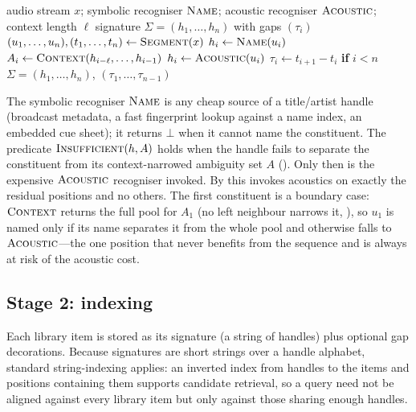 \documentclass[11pt,twocolumn,a4paper]{article}
\theoremstyle{thmstyle}
\theoremstyle{definition}
\theoremstyle{remark}
\newcommand{\hand}{h}
\newcommand{\sig}{\Sigma}
\begin{document}
\begin{algorithm}[!htbp]
\caption{\textsc{Acquire}: stream $\to$ signature}
\label{alg:acquire}
\begin{algorithmic}[1]
\Require audio stream $x$; symbolic recogniser $\textsc{Name}$; acoustic
  recogniser $\textsc{Acoustic}$; context length $\ell$
\Ensure signature $\sig=(\hand_1,\dots,\hand_n)$ with gaps $(\tau_i)$
\State $(u_1,\dots,u_n),(t_1,\dots,t_n)\gets\textsc{Segment}(x)$
  \State $\hand_i \gets \textsc{Name}(u_i)$
  \State $A_i \gets \textsc{Context}(\hand_{i-\ell},\dots,\hand_{i-1})$
  \If{$\hand_i = \bot$ \textbf{or} $\textsc{Insufficient}(\hand_i, A_i)$}
    \State $\hand_i \gets \textsc{Acoustic}(u_i)$
  \EndIf
  \State $\tau_i \gets t_{i+1}-t_i$ \textbf{if} $i<n$
\EndFor
\State \Return $\sig=(\hand_1,\dots,\hand_n)$, $(\tau_1,\dots,\tau_{n-1})$
\end{algorithmic}
\end{algorithm}

The symbolic recogniser $\textsc{Name}$ is any cheap source of a title/artist
handle (broadcast metadata, a fast fingerprint lookup against a name index, an
embedded cue sheet); it returns $\bot$ when it cannot name the constituent. The
predicate $\textsc{Insufficient}(\hand,A)$ holds when the handle fails to
separate the constituent from its context-narrowed ambiguity set $A$
(). Only then is the expensive $\textsc{Acoustic}$ recogniser
invoked. By  this invokes acoustics on exactly the residual
positions and no others. The first constituent is a boundary case: $\textsc{Context}$
returns the full pool for $A_1$ (no left neighbour narrows it,
), so $u_1$ is named only if its name separates it from the
whole pool and otherwise falls to $\textsc{Acoustic}$---the one position that
never benefits from the sequence and is always at risk of the acoustic cost.

\subsection{Stage 2: indexing}

Each library item is stored as its signature (a string of handles) plus optional
gap decorations. Because signatures are short strings over a handle alphabet,
standard string-indexing applies: an inverted index from handles to the items and
positions containing them \citep{manning2008} supports candidate retrieval, so a
query need not be aligned against every library item but only against those
sharing enough handles.
\end{document}

